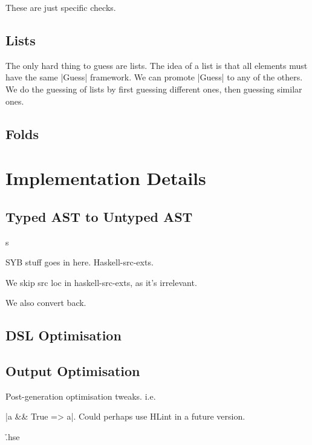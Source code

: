\documentclass[preprint,draft]{sigplanconf}
\begin{document}
These are just specific checks.

\subsection{Lists}

The only hard thing to guess are lists. The idea of a list is that all elements must have the same |Guess| framework. We can promote |Guess| to any of the others. We do the guessing of lists by first guessing different ones, then guessing similar ones.

\subsection{Folds}


\section{Implementation Details}
\label{sec:implementation}

\subsection{Typed AST to Untyped AST}s
\label{sec:universe}

SYB stuff goes in here. Haskell-src-exts.

We skip src loc in haskell-src-exts, as it's irrelevant.

We also convert back.

\subsection{DSL Optimisation}

\subsection{Output Optimisation}
\label{sec:simplify}

Post-generation optimisation tweaks. i.e. \ignore|a && True => a|. Could perhaps use HLint in a future version.

\h{.hse}
\end{document}
